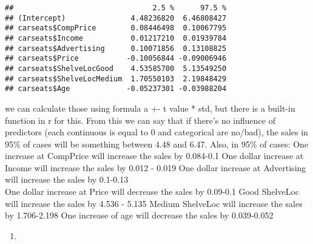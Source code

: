 \documentclass[
]{article}
\newenvironment{Shaded}{\begin{snugshade}}{\end{snugshade}}
\newcommand{\AttributeTok}[1]{\textcolor[rgb]{0.13,0.29,0.53}{#1}}
\newcommand{\DecValTok}[1]{\textcolor[rgb]{0.00,0.00,0.81}{#1}}
\newcommand{\FunctionTok}[1]{\textcolor[rgb]{0.13,0.29,0.53}{\textbf{#1}}}
\newcommand{\NormalTok}[1]{#1}
\newcommand{\SpecialCharTok}[1]{\textcolor[rgb]{0.81,0.36,0.00}{\textbf{#1}}}
\providecommand{\tightlist}{%
  \setlength{\itemsep}{0pt}\setlength{\parskip}{0pt}}
\begin{document}
\begin{verbatim}
##                                2.5 %      97.5 %
## (Intercept)               4.48236820  6.46808427
## carseats$CompPrice        0.08446498  0.10067795
## carseats$Income           0.01217210  0.01939784
## carseats$Advertising      0.10071856  0.13108825
## carseats$Price           -0.10056844 -0.09006946
## carseats$ShelveLocGood    4.53585700  5.13549250
## carseats$ShelveLocMedium  1.70550103  2.19848429
## carseats$Age             -0.05237301 -0.03988204
\end{verbatim}

we can calculate those using formula a +- t value * std, but there is a
built-in function in r for this. From this we can say that if there's no
influence of predictors (each continuous is equal to 0 and categorical
are no/bad), the sales in 95\% of cases will be something between 4.48
and 6.47. Also, in 95\% of cases: One increase at CompPrice will
increase the sales by 0.084-0.1 One dollar increase at Income will
increase the sales by 0.012 - 0.019 One dollar increase at Advertising
will increase the sales by 0.1-0.13\\
One dollar increase at Price will decrease the sales by 0.09-0.1 Good
ShelveLoc will increase the sales by 4.536 - 5.135 Medium ShelveLoc will
increase the sales by 1.706-2.198 One increase of age will decrease the
sales by 0.039-0.052

\begin{enumerate}
\def\labelenumi{\alph{enumi})}
\setcounter{enumi}{6}
\tightlist
\item
\end{enumerate}

\begin{Shaded}
\end{Shaded}
\end{document}
